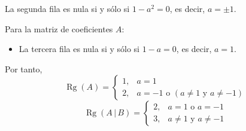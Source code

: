 \documentclass[a4paper,12pt]{article}
\begin{document}
\begin{ejercicio}[title=Ejercicio 31]
\begin{itemize}
La segunda fila es nula si y sólo si \(1-a^2=0\), es decir, \(a=\pm1\).

Para la matriz de coeficientes \(A\):
\begin{itemize}
\item La tercera fila es nula si y sólo si \(1-a=0\), es decir, \(a=1\).
\end{itemize}

Por tanto,
\[
\operatorname{Rg}(A)=
\begin{cases}
1, & a=1\\
2, & a=-1 \text{ o } (a\neq 1 \text{ y } a\neq -1)
\end{cases}
\]
\[
\operatorname{Rg}(A\,|\,B)=
\begin{cases}
2, & a=1 \text{ o } a=-1\\
3, & a\neq 1 \text{ y } a\neq -1
\end{cases}
\]
\end{itemize}
\end{ejercicio}
\end{document}
